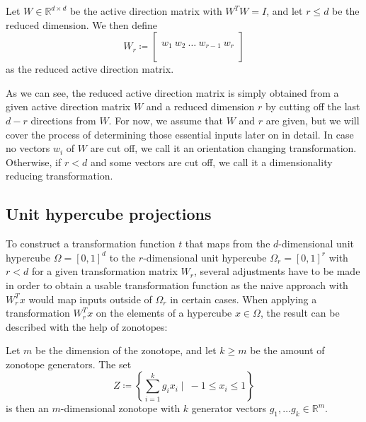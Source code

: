 \documentclass[
  a4paper,  %
  twoside,  %
  bibliography=totoc,
  headsepline,
  cleardoublepage=empty,
  parskip=half,
  draft=false
]{scrbook}
\begin{document}
\begin{definition}
Let $W \in \mathds{R}^{d \times d}$ be the active direction matrix with $W^T W=I$, and let $r \leq d$ be the reduced dimension.
We then define
\begin{equation}
W_r \coloneqq \begin{bmatrix}
  \\
    w_1 ~ w_2 ~ \dots ~ w_{r-1} ~ w_r\\
    \\
  \end{bmatrix}
\end{equation}
as the reduced active direction matrix.
\end{definition}
%
As we can see, the reduced active direction matrix is simply obtained from a given active direction matrix $W$ and a reduced dimension $r$ by cutting off the last $d - r$ directions from $W$.
For now, we assume that $W$ and $r$ are given, but we will cover the process of determining those essential inputs later on in detail.
In case no vectors $w_i$ of $W$ are cut off, we call it an orientation changing transformation.
Otherwise, if $r < d$ and some vectors are cut off, we call it a dimensionality reducing transformation.

\subsection{Unit hypercube projections}

To construct a transformation function $t$ that maps from the $d$-dimensional unit hypercube $\Omega=[0,1]^d$ to the $r$-dimensional unit hypercube $\Omega_r=[0,1]^r$ with $r < d$ for a given transformation matrix $W_r$, several adjustments have to be made in order to obtain a usable transformation function as the naive approach with $W_r^T x$ would map inputs outside of $\Omega_r$ in certain cases.
When applying a transformation $W_r^T x$ on the elements of a hypercube $x \in \Omega$, the result can be described with the help of zonotopes:
\begin{definition}[Zonotope]
Let $m$ be the dimension of the zonotope, and let $k \geq  m$ be the amount of zonotope generators.
The set
\begin{equation}
Z \coloneqq \left\{\sum_{i=1}^k g_i x_i \mid ~ -1 \leq x_i \leq 1\right\}
  \label{zonotope}
\end{equation}
is then an $m$-dimensional zonotope  with $k$ generator vectors $g_1, \dots g_k \in \mathds{R}^m$.
\end{definition}
\end{document}
